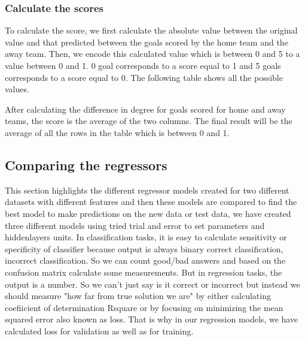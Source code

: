 \subsubsection{Calculate the scores}

To calculate the score, we first calculate the absolute value between the original value 
and that predicted between the goals scored by the home team and the away team.
Then, we encode this calculated value which is between 0 and 5 to a value between 0 and 1. 
0 goal corresponds to a score equal to 1 and 5 goals corresponds to a score equal to 0.
The following table shows all the possible values.


\begin{table}[H]
    \centering
    \caption{Calculate the degree difference}
    \label{table:qualitycriteriaround}
\end{table}

After calculating the difference in degree for goals scored for home and away teams, the score is the average of the two columns. The final result will be the average of all the rows in the table which is between 0 and 1.

\subsection{Comparing the regressors}
This section highlights the different regressor models created for two different datasets with different features and then these models are compared to find the best model to make predictions on the new data or test data, we have created three different models using tried trial and error to set parameters and hiddenlayers units.\newline 
In classification tasks, it is easy to calculate sensitivity or specificity of classifier because output is always binary {correct classification, incorrect classification}. So we can count good/bad answers and based on the confusion matrix calculate some measurements. But in regression tasks, the output is a number. So we can't just say is it correct or incorrect but instead we should measure "how far from true solution we are" by either calculating coefiicient of determination Rsquare or by focusing on minimizing the mean squared error also known as loss. That is why in our regression models, we have calculated loss for validation as well as for training.
